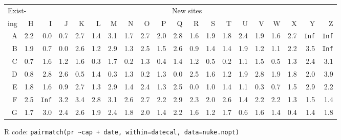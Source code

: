 \begin{frame}[fragile]
\addtolength{\tabcolsep}{-\tabcolsepadj} \vfill
\begin{center}
{\footnotesize
\begin{tabular}{|r|rrrrrrrrrrrrrrrrrrr|}
\hline
\multicolumn{2}{|l}{Exist-} & \multicolumn{18}{c|}{New sites} \\
\multicolumn{1}{|l}{ing}& H & I & J & K & L & M & N & O & P & Q & R & S & T & U & V & W & X & Y & Z \\ 
  \hline
A & 2.2 & 0.0 & 0.7 & 2.7 & 1.4 & 3.1 & 1.7 & 2.7 & 2.0 & 2.8 & 1.6 & 1.9 & 1.8 & 2.4 & 1.9 & 1.6 & 2.7 & \texttt{Inf} & \texttt{Inf} \\ 
  B & 1.9 & 0.7 & 0.0 & 2.6 & 1.2 & 2.9 & 1.3 & 2.5 & 1.5 & 2.6 & 0.9 & 1.4 & 1.4 & 1.9 & 1.2 & 1.1 & 2.2 & 3.5 & \texttt{Inf} \\ 
  C & 0.7 & 1.6 & 1.2 & 1.6 & 0.3 & 1.7 & 0.2 & 1.3 & 0.4 & 1.4 & 1.2 & 0.5 & 0.2 & 1.1 & 1.5 & 0.5 & 1.3 & 2.4 & 3.1 \\ 
  D & 0.8 & 2.8 & 2.6 & 0.5 & 1.4 & 0.3 & 1.3 & 0.2 & 1.3 & 0.0 & 2.5 & 1.6 & 1.2 & 1.9 & 2.8 & 1.9 & 1.8 & 2.0 & 3.9 \\ 
  E & 1.8 & 1.6 & 0.9 & 2.7 & 1.3 & 2.9 & 1.4 & 2.4 & 1.3 & 2.5 & 0.0 & 1.0 & 1.4 & 1.1 & 0.3 & 0.7 & 1.5 & 2.9 & 2.2 \\ 
  F & 2.5 & \texttt{Inf} & 3.2 & 3.4 & 2.8 & 3.1 & 2.6 & 2.7 & 2.2 & 2.9 & 2.3 & 2.0 & 2.6 & 1.4 & 2.2 & 2.2 & 1.3 & 1.5 & 1.4 \\ 
  G & 1.7 & 3.0 & 2.4 & 2.6 & 1.9 & 2.4 & 1.8 & 2.0 & 1.4 & 2.2 & 1.6 & 1.2 & 1.7 & 0.6 & 1.6 & 1.4 & 0.4 & 1.4 & 1.8 \\ 
   \hline
\end{tabular}
}
\vfill \addtolength{\tabcolsep}{\tabcolsepadj}
\end{center}

R code:
\texttt{pairmatch(pr \textasciitilde cap + date, within=datecal,  data=nuke.nopt)}

\end{frame}
\Note{
}



